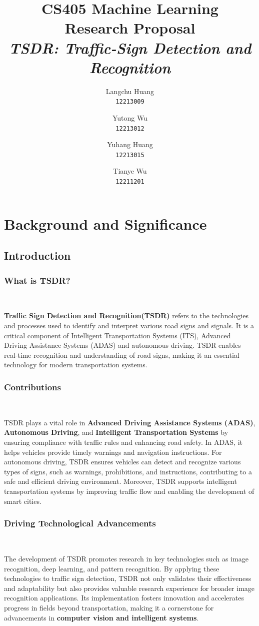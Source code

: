 \documentclass[letterpaper, 10 pt, conference]{ieeeconf}
\title{
\Large \bf CS405 Machine Learning\\
\huge Research Proposal\\
\vspace{0.5em}
\Large \textit{TSDR: Traffic-Sign Detection and Recognition}
}
\author{
Langchu Huang \\ 
\texttt{12213009} \\
\and
Yutong Wu \\ 
\texttt{12213012} \\
\and
Yuhang Huang \\ 
\texttt{12213015}
\and
Tianye Wu \\ 
\texttt{12211201} \\
}
\begin{document}
\maketitle

\section{Background and Significance}
\hrulefill

\subsection{Introduction}

\subsubsection{What is TSDR?}\

\textbf{Traffic Sign Detection and Recognition(TSDR)} refers to the technologies and processes used to identify and interpret various road signs and signals. It is a critical component of Intelligent Transportation Systems (ITS), Advanced Driving Assistance Systems (ADAS) and autonomous driving. TSDR enables real-time recognition and understanding of road signs, making it an essential technology for modern transportation systems.

\subsubsection{Contributions}\

TSDR plays a vital role in \textbf{Advanced Driving Assistance Systems (ADAS)}, \textbf{Autonomous Driving}, and \textbf{Intelligent Transportation Systems} by ensuring compliance with traffic rules and enhancing road safety. In ADAS, it helps vehicles provide timely warnings and navigation instructions. For autonomous driving, TSDR ensures vehicles can detect and recognize various types of signs, such as warnings, prohibitions, and instructions, contributing to a safe and efficient driving environment. Moreover, TSDR supports intelligent transportation systems by improving traffic flow and enabling the development of smart cities.

\subsubsection{Driving Technological Advancements}\

The development of TSDR promotes research in key technologies such as image recognition, deep learning, and pattern recognition. By applying these technologies to traffic sign detection, TSDR not only validates their effectiveness and adaptability but also provides valuable research experience for broader image recognition applications. Its implementation fosters innovation and accelerates progress in fields beyond transportation, making it a cornerstone for advancements in \textbf{computer vision and intelligent systems}.
\end{document}
